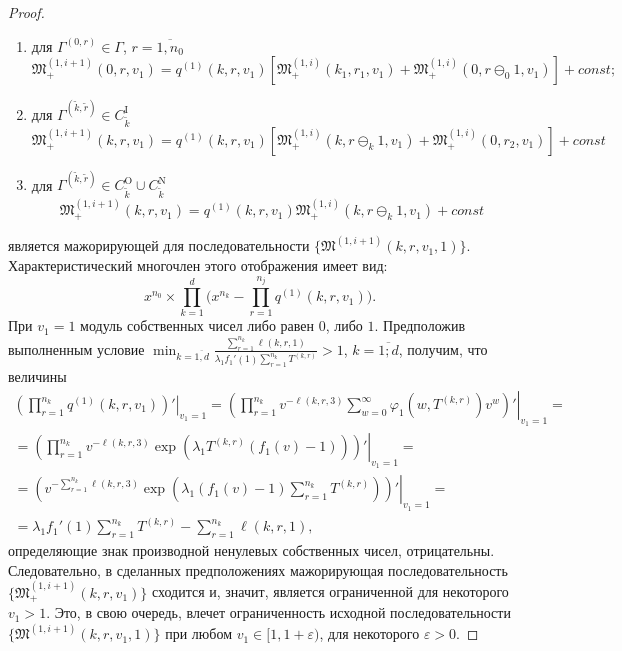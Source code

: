 \documentclass[a4paper,12pt,russian]{extarticle}
\begin{document}
\begin{proof}
\begin{enumerate}
\item для $ \Gamma^{(0,r)} \in \Gamma$, $r = \overline{1,n_0}$ 
$$
\mathfrak{M}_+^{(1,i+1)}(0,r,v_1) = q^{(1)}(k,r,v_1)
[\mathfrak{M}_+^{(1,i)}(k_1, r_1,v_1) +\mathfrak{M}_+^{(1,i)}(0, r\ominus_0 1,v_1) ] + const;
$$
\item для $\Gamma^{(\tilde{k},\tilde{r})} \in C_{\tilde{k}}^{\mathrm{I}}$
\begin{equation*}
 \mathfrak{M}_+^{(1,i+1)}(k,r,v_1) = q^{(1)}(k,r,v_1) [ \mathfrak{M}_+^{(1,i)}(k,r\ominus_{k}1,v_1) +\mathfrak{M}_+^{(1,i)}(0,r_2,v_1) ]+ const
\end{equation*}
\item для $\Gamma^{(\tilde{k},\tilde{r})} \in C_{\tilde{k}}^{\mathrm{O}} \cup C_{\tilde{k}}^{\mathrm{N}}$
\begin{equation*}
\mathfrak{M}_+^{(1,i+1)}(k,r,v_1) = q^{(1)}(k,r,v_1) \mathfrak{M}_+^{(1,i)}(k,r\ominus_k 1,v_1) + const
\end{equation*}
\end{enumerate}
является мажорирующей для последовательности $\{\mathfrak{M}^{(1,i+1)}(k,r,v_1,1)\}$.
Характеристический многочлен этого отображения имеет вид:
$$
x^{n_0} \times \prod_{k=1}^{d} \big(x^{n_k} - \prod_{r=1}^{n_j}q^{(1)}(k,r,v_1)\big).
$$
При $v_1=1$ модуль собственных чисел либо равен $0$, либо $1$.
Предположив выполненным условие $\min_{k=\overline{1,d}} { \frac{\sum_{r = 1}^{n_k} \ell(k,r,1) }{\lambda_1 f_1'(1) \sum_{r=1}^{n_k} T^{(k,r)} }}>1$, $k=\overline{1;d}$, получим, что величины
\begin{multline}
 \left.\left(\prod_{r=1}^{n_k}q^{(1)}(k,r,v_1)\right) ' \right|_{v_1=1} = 
  \left.\left(\prod_{r=1}^{n_k}v^{-\ell(k,r,3)}\sum_{w=0}^{\infty} \varphi_1(w,T^{(k,r)})v^w \right) ' \right|_{v_1=1} = \\ =
   \left.\left(\prod_{r=1}^{n_k} v^{-\ell(k,r,3)}\exp(\lambda_1 T^{(k,r)} (f_1(v)-1))\right) ' \right|_{v_1=1} = \\ =
    \left.\left(v^{-\sum_{r=1}^{n_k}\ell(k,r,3)}\exp(\lambda_1 (f_1(v)-1)\sum_{r=1}^{n_k} T^{(k,r)}) \right) ' \right|_{v_1=1} = \\ =
\lambda_1 f_1'(1) \sum_{r=1}^{n_k} T^{(k,r)} -\sum_{r=1}^{n_k} \ell(k,r,1), 
\label{derivative:cycle}
\end{multline}
определяющие знак производной ненулевых собственных чисел, отрицательны. Следовательно, в сделанных предположениях мажорирующая последовательность \linebreak $\{\mathfrak{M}_+^{(1,i+1)}(k,r,v_1)\}$ сходится и, значит, является ограниченной для некоторого $v_1>1$. Это, в свою очередь, влечет ограниченность исходной последовательности \linebreak $\{\mathfrak{M}^{(1,i+1)}(k,r,v_1,1)\}$ при любом $v_1 \in [1, 1+\varepsilon)$, для некоторого $\varepsilon > 0$.

\end{proof}
\end{document}
